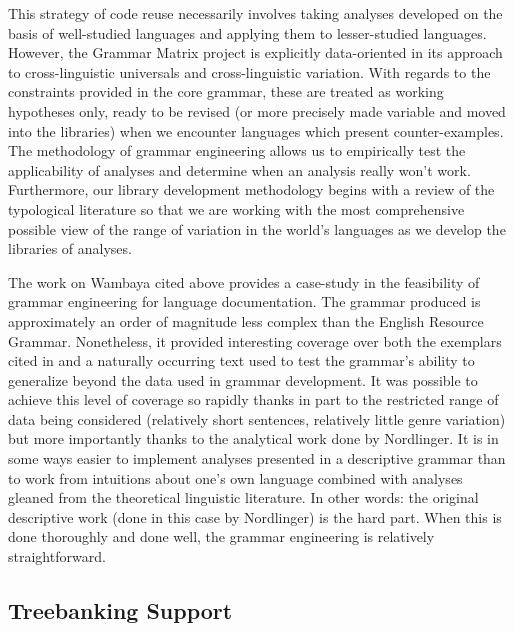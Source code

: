 This strategy of code reuse necessarily involves taking analyses
developed on the basis of well-studied languages and applying them to
lesser-studied languages.  However, the Grammar Matrix project is
explicitly data-oriented in its approach to cross-linguistic
universals and cross-linguistic variation.  With regards to the
constraints provided in the core grammar, these are treated as working
hypotheses only, ready to be revised (or more precisely made variable
and moved into the libraries) when we encounter languages which
present counter-examples.  The methodology of grammar engineering
allows us to empirically test the applicability of analyses and
determine when an analysis really won't work.  Furthermore, our
library development methodology begins with a review of the
typological literature so that we are working with the most
comprehensive possible view of the range of variation in the world's
languages as we develop the libraries of analyses.

The work on Wambaya cited above \citep{Bender:08a} provides 
a case-study in the feasibility of grammar engineering for language
documentation.  The grammar produced is approximately an order
of magnitude less complex than the English Resource Grammar.
Nonetheless, it provided interesting coverage over both the
exemplars cited in  and a naturally occurring
text used to test the grammar's ability to generalize beyond the
data used in grammar development.  It was possible to achieve this
level of coverage so rapidly thanks in part to the restricted
range of data being considered (relatively short sentences, relatively
little genre variation) but more importantly thanks to the analytical
work done by Nordlinger.  It is in some ways easier to implement analyses
presented in a descriptive grammar than to work from intuitions about
one's own language combined with analyses gleaned from the theoretical
linguistic literature.  In other words: the original descriptive
work (done in this case by Nordlinger) is the hard part.  When this is
done thoroughly and done well, the grammar engineering is relatively
straightforward.

\subsection{Treebanking Support}

